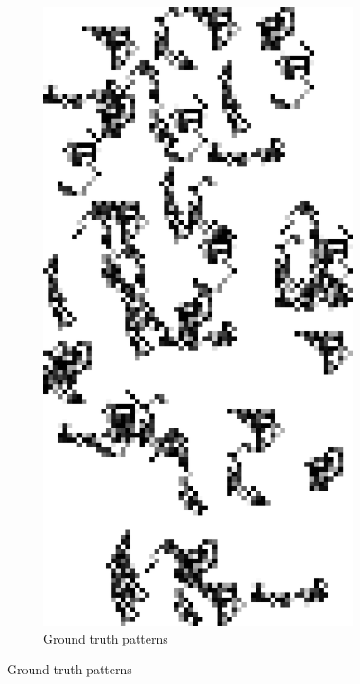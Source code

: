 \documentclass{llncs}
\begin{document}
\begin{figure}
~
\begin{subfigure}[t]{0.25\textwidth}
\centering
\includegraphics[scale=.9]{img/exp_inputpatterns_2.png}
\caption{Ground truth patterns}
\label{fig:rilb}
\end{subfigure}%

\end{figure}
\end{document}
